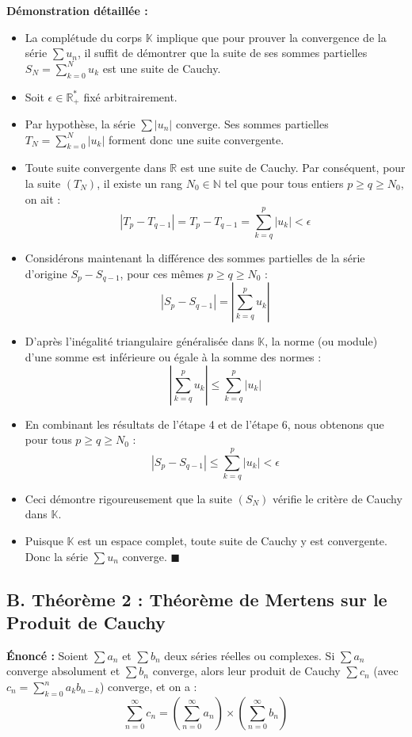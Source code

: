 \documentclass[12pt,a4paper]{report}
\begin{document}
\textbf{Démonstration détaillée  :}
\begin{itemize}
\item La complétude du corps $\mathbb{K}$ implique que pour prouver la convergence de la série $\sum u_n$, il suffit de démontrer que la suite de ses sommes partielles $S_N = \sum_{k=0}^N u_k$ est une suite de Cauchy.
\item Soit $\epsilon \in \mathbb{R}_+^*$ fixé arbitrairement.
\item Par hypothèse, la série $\sum |u_n|$ converge. Ses sommes partielles $T_N = \sum_{k=0}^N |u_k|$ forment donc une suite convergente.
\item Toute suite convergente dans $\mathbb{R}$ est une suite de Cauchy. Par conséquent, pour la suite $(T_N)$, il existe un rang $N_0 \in \mathbb{N}$ tel que pour tous entiers $p \ge q \ge N_0$, on ait :
   $$|T_p - T_{q-1}| = T_p - T_{q-1} = \sum_{k=q}^p |u_k| < \epsilon$$
\item Considérons maintenant la différence des sommes partielles de la série d'origine $S_p - S_{q-1}$, pour ces mêmes $p \ge q \ge N_0$ :
   $$|S_p - S_{q-1}| = \left| \sum_{k=q}^p u_k \right|$$
\item D'après l'inégalité triangulaire généralisée dans $\mathbb{K}$, la norme (ou module) d'une somme est inférieure ou égale à la somme des normes :
   $$\left| \sum_{k=q}^p u_k \right| \le \sum_{k=q}^p |u_k|$$
\item En combinant les résultats de l'étape 4 et de l'étape 6, nous obtenons que pour tous $p \ge q \ge N_0$ :
   $$|S_p - S_{q-1}| \le \sum_{k=q}^p |u_k| < \epsilon$$
\item Ceci démontre rigoureusement que la suite $(S_N)$ vérifie le critère de Cauchy dans $\mathbb{K}$.
\item Puisque $\mathbb{K}$ est un espace complet, toute suite de Cauchy y est convergente. Donc la série $\sum u_n$ converge. $\blacksquare$
\end{itemize}

\subsection{B. Théorème 2 : Théorème de Mertens sur le Produit de Cauchy}

\textbf{Énoncé :} Soient $\sum a_n$ et $\sum b_n$ deux séries réelles ou complexes. Si $\sum a_n$ converge absolument et $\sum b_n$ converge, alors leur produit de Cauchy $\sum c_n$ (avec $c_n = \sum_{k=0}^n a_k b_{n-k}$) converge, et on a :
$$\sum_{n=0}^\infty c_n = \left( \sum_{n=0}^\infty a_n \right) \times \left( \sum_{n=0}^\infty b_n \right)$$
\end{document}
